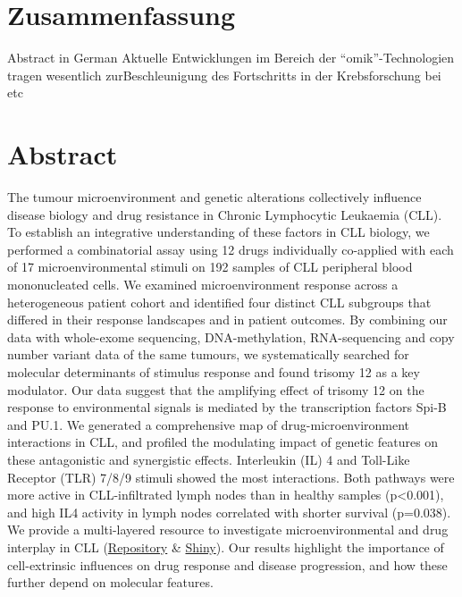 \documentclass[11pt, a4paper, twosided]{book}
\begin{document}
    \hypertarget{zusammenfassung}{%
    \chapter*{Zusammenfassung}\label{zusammenfassung}}

    Abstract in German
    Aktuelle Entwicklungen im Bereich der ``omik''-Technologien tragen wesentlich zurBeschleunigung des Fortschritts in der Krebsforschung bei etc
\newpage\null\newpage


    \hypertarget{abstract}{%
    \chapter*{Abstract}\label{abstract}}

    The tumour microenvironment and genetic alterations collectively influence disease biology and drug resistance in Chronic Lymphocytic Leukaemia (CLL). To establish an integrative understanding of these factors in CLL biology, we performed a combinatorial assay using 12 drugs individually co-applied with each of 17 microenvironmental stimuli on 192 samples of CLL peripheral blood mononucleated cells. We examined microenvironment response across a heterogeneous patient cohort and identified four distinct CLL subgroups that differed in their response landscapes and in patient outcomes. By combining our data with whole-exome sequencing, DNA-methylation, RNA-sequencing and copy number variant data of the same tumours, we systematically searched for molecular determinants of stimulus response and found trisomy 12 as a key modulator. Our data suggest that the amplifying effect of trisomy 12 on the response to environmental signals is mediated by the transcription factors Spi-B and PU.1. We generated a comprehensive map of drug-microenvironment interactions in CLL, and profiled the modulating impact of genetic features on these antagonistic and synergistic effects. Interleukin (IL) 4 and Toll-Like Receptor (TLR) 7/8/9 stimuli showed the most interactions. Both pathways were more active in CLL-infiltrated lymph nodes than in healthy samples (p\textless0.001), and high IL4 activity in lymph nodes correlated with shorter survival (p=0.038). We provide a multi-layered resource to investigate microenvironmental and drug interplay in CLL (\href{https://git.embl.de/giles/cllcytokinescreen2021}{Repository} \& \href{https://www.google.com/url?q=https://www.imbi.uni-heidelberg.de/dietrichlab/CLL_Microenvironment/\&sa=D\&source=editors\&ust=1625764640786000\&usg=AOvVaw01HOFP7k2BJRLTteCXa8qy}{Shiny}). Our results highlight the importance of cell-extrinsic influences on drug response and disease progression, and how these further depend on molecular features.
\newpage\null\newpage
\end{document}
